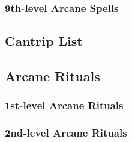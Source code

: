 \subsubsection{9th-level Arcane Spells}
\begin{swspelllist}

    \SLdisjoinmagic[Abjur]
    \SLshadowshield

    \SLavatarofblades[Conj]
    \SLdimensionalarmy
    \SLmaze

    \SLrevelation[Div]

    \SLirresistibledance[Ench]

    \SLmeteorswarm[Evoc]

    \SLshadowshield[Illus]

    \SLassimilate[Trans]
    \SLtimestop
    \SLtransmuteanyobject

    \SLassimilate[Vivi]
    \SLhorridwilting
    \SLwailofthebanshee

    \SLprismaticstorm[Univ]
\end{swspelllist}

\subsection{Cantrip List}\label{Cantrip List}
\begin{swspelllist}
    \SLresistdamage[Abjur]
    \SLacidorb[Conj]
    \SLconjureprojectile
    \SLtwistfate[Div]
    \SLcombattelekinesis[Evoc]
    \SLmagicray
    \SLflare[Illus]
    \SLaugmentattack[Trans]
    \SLdrainingtouch[Vivi]
    \SLexhaustion
\end{swspelllist}

\subsection{Arcane Rituals}\label{Arcane Rituals}
\subsubsection{1st-level Arcane Rituals}
\begin{rituallist}
    \SLendureelements[Abjur]
    \SLcreatewater[Conj]
    \SLmount
    \SLunseenservant
    \SLalarm[Div]
    \SLappraisal
    \SLidentify
    \SLreadmagic
    \SLfloatingdisk[Evoc]
    \SLdisguiseself[Illus]
    \SLlight
    \SLmagicaura
    \SLerase[Trans]
    \SLmending
    \SLpurifysustenance
    \SLarcanemark[Univ]
\end{rituallist}

\subsubsection{2nd-level Arcane Rituals}
\begin{rituallist}
    \SLarcanelock[Abjur]
    \SLinvisibilitypurge
    \SLundetectablealignment
    \SLcreatesustenance[Conj]
    \SLcomprehendlanguages[Div]
    \SLfindtraps
    \SLzoneoftruth[Ench]
    \SLdarkness[Illus]
    \SLmagicmouth
    \SLenhancearmor[Trans]
    \SLenhanceweapon
    \SLgentlerepose
    \SLshapeweapon
    \SLshaping
    \SLwaterbreathing
\end{rituallist}
